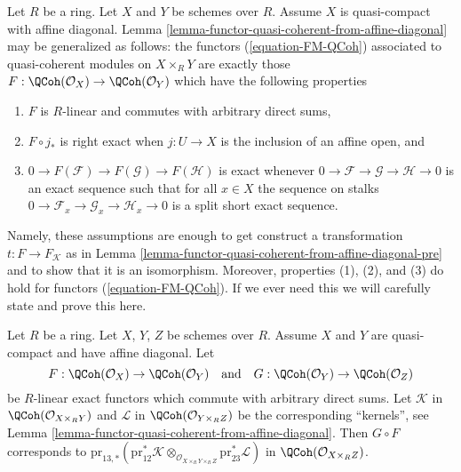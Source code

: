 \begin{remark}
\label{remark-characterize-FM-QCoh}
Let $R$ be a ring. Let $X$ and $Y$ be schemes over $R$. Assume $X$
is quasi-compact with affine diagonal.
Lemma \ref{lemma-functor-quasi-coherent-from-affine-diagonal} may
be generalized as follows: the functors
(\ref{equation-FM-QCoh}) associated to quasi-coherent modules on
$X \times_R Y$ are exactly those
$F : \QCoh(\mathcal{O}_X) \to \QCoh(\mathcal{O}_Y)$
which have the following properties
\begin{enumerate}
\item $F$ is $R$-linear and commutes with arbitrary direct sums,
\item $F \circ j_*$ is right exact when $j : U \to X$ is the
inclusion of an affine open, and
\item $0 \to F(\mathcal{F}) \to F(\mathcal{G}) \to F(\mathcal{H})$
is exact whenever $0 \to \mathcal{F} \to \mathcal{G} \to \mathcal{H} \to 0$
is an exact sequence such that for all $x \in X$ the sequence on stalks
$0 \to \mathcal{F}_x \to \mathcal{G}_x \to \mathcal{H}_x \to 0$
is a split short exact sequence.
\end{enumerate}
Namely, these assumptions are enough to get construct a transformation
$t : F \to F_\mathcal{K}$ as in
Lemma \ref{lemma-functor-quasi-coherent-from-affine-diagonal-pre}
and to show that it is an isomorphism. Moreover, properties (1), (2), and (3)
do hold for functors (\ref{equation-FM-QCoh}).
If we ever need this we will carefully state and prove this here.
\end{remark}

\begin{lemma}
\label{lemma-compose-FM-QCoh}
Let $R$ be a ring. Let $X$, $Y$, $Z$ be schemes over $R$. Assume
$X$ and $Y$ are quasi-compact and have affine diagonal. Let
$$
F : \QCoh(\mathcal{O}_X) \to \QCoh(\mathcal{O}_Y)
\quad\text{and}\quad
G : \QCoh(\mathcal{O}_Y) \to \QCoh(\mathcal{O}_Z)
$$
be $R$-linear exact functors which commute with arbitrary direct sums.
Let $\mathcal{K}$ in $\QCoh(\mathcal{O}_{X \times_R Y})$
and $\mathcal{L}$ in $\QCoh(\mathcal{O}_{Y \times_R Z})$
be the corresponding ``kernels'', see
Lemma \ref{lemma-functor-quasi-coherent-from-affine-diagonal}.
Then $G \circ F$ corresponds to
$\text{pr}_{13, *}(\text{pr}_{12}^*\mathcal{K}
\otimes_{\mathcal{O}_{X \times_R Y \times_R Z}}
\text{pr}_{23}^*\mathcal{L})$ in $\QCoh(\mathcal{O}_{X \times_R Z})$.
\end{lemma}

